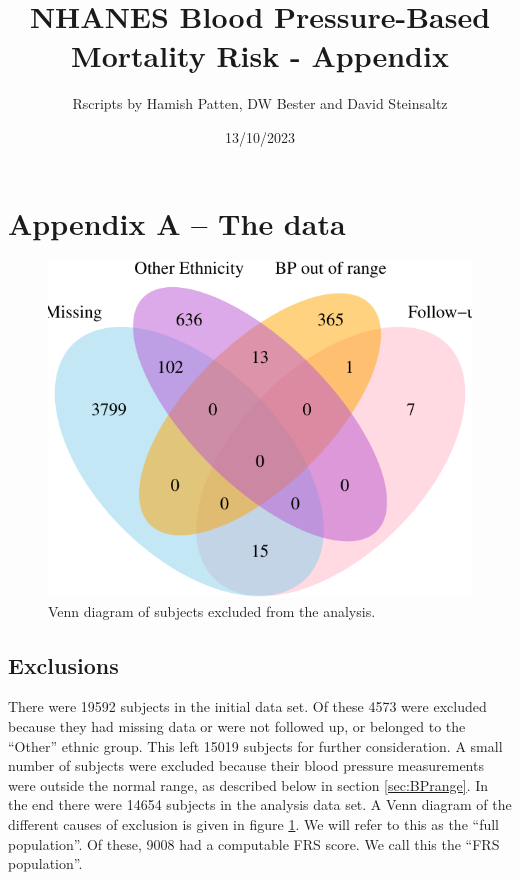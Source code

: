\documentclass[
]{article}
\title{NHANES Blood Pressure-Based Mortality Risk - Appendix}
\author{Rscripts by Hamish Patten, DW Bester and David Steinsaltz}
\date{13/10/2023}
\begin{document}
\maketitle

{
\setcounter{tocdepth}{3}
\tableofcontents
}
\hypertarget{appendix-a-the-data}{%
\section{Appendix A -- The data}\label{appendix-a-the-data}}

\begin{figure}

{\centering \includegraphics{Appendix_files/figure-latex/Venn1-1} 

}

\caption{Venn diagram of subjects excluded from the analysis.}\label{fig:Venn1}
\end{figure}

\hypertarget{exclusions}{%
\subsection{Exclusions}\label{exclusions}}

There were 19592 subjects in the initial data set.
Of these 4573 were excluded because they had missing data or were not followed up, or belonged to the ``Other'' ethnic group.
This left 15019 subjects for further consideration.
A small number of subjects were excluded because their blood pressure measurements were outside the normal range, as described below in section \ref{sec:BPrange}.
In the end there were 14654 subjects in the analysis data set.
A Venn diagram of the different causes of exclusion is given in figure \ref{fig:Venn1}.
We will refer to this as the ``full population''.
Of these, 9008 had a computable FRS score.
We call this the ``FRS population''.
\end{document}
